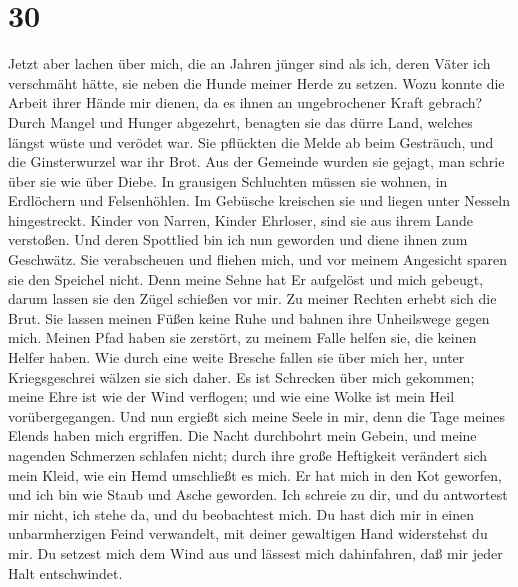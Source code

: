 \hypertarget{section-29}{%
\section{30}\label{section-29}}

 Jetzt aber lachen über mich, die an Jahren jünger sind
als ich, deren Väter ich verschmäht hätte, sie neben die Hunde meiner
Herde zu setzen.  Wozu konnte die Arbeit ihrer Hände mir
dienen, da es ihnen an ungebrochener Kraft gebrach?  Durch
Mangel und Hunger abgezehrt, benagten sie das dürre Land, welches längst
wüste und verödet war.  Sie pflückten die Melde ab beim
Gesträuch, und die Ginsterwurzel war ihr Brot.  Aus der
Gemeinde wurden sie gejagt, man schrie über sie wie über Diebe.
 In grausigen Schluchten müssen sie wohnen, in Erdlöchern
und Felsenhöhlen.  Im Gebüsche kreischen sie und liegen
unter Nesseln hingestreckt.  Kinder von Narren, Kinder
Ehrloser, sind sie aus ihrem Lande verstoßen.  Und deren
Spottlied bin ich nun geworden und diene ihnen zum Geschwätz.
 Sie verabscheuen und fliehen mich, und vor meinem
Angesicht sparen sie den Speichel nicht.  Denn meine
Sehne hat Er aufgelöst und mich gebeugt, darum lassen sie den Zügel
schießen vor mir.  Zu meiner Rechten erhebt sich die
Brut. Sie lassen meinen Füßen keine Ruhe und bahnen ihre Unheilswege
gegen mich.  Meinen Pfad haben sie zerstört, zu meinem
Falle helfen sie, die keinen Helfer haben.  Wie durch
eine weite Bresche fallen sie über mich her, unter Kriegsgeschrei wälzen
sie sich daher.  Es ist Schrecken über mich gekommen;
meine Ehre ist wie der Wind verflogen; und wie eine Wolke ist mein Heil
vorübergegangen.  Und nun ergießt sich meine Seele in
mir, denn die Tage meines Elends haben mich ergriffen. 
Die Nacht durchbohrt mein Gebein, und meine nagenden Schmerzen schlafen
nicht;  durch ihre große Heftigkeit verändert sich mein
Kleid, wie ein Hemd umschließt es mich.  Er hat mich in
den Kot geworfen, und ich bin wie Staub und Asche geworden.
 Ich schreie zu dir, und du antwortest mir nicht, ich
stehe da, und du beobachtest mich.  Du hast dich mir in
einen unbarmherzigen Feind verwandelt, mit deiner gewaltigen Hand
widerstehst du mir.  Du setzest mich dem Wind aus und
lässest mich dahinfahren, daß mir jeder Halt entschwindet.
